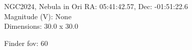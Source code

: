 \begin{block}{NGC2024, Nebula in Ori}
    RA: 05:41:42.57, Dec: -01:51:22.6 \\ 
    Magnitude (V): None \\ 
    Dimensions: 30.0 x 30.0 

    Finder fov: 60 
\end{block}
